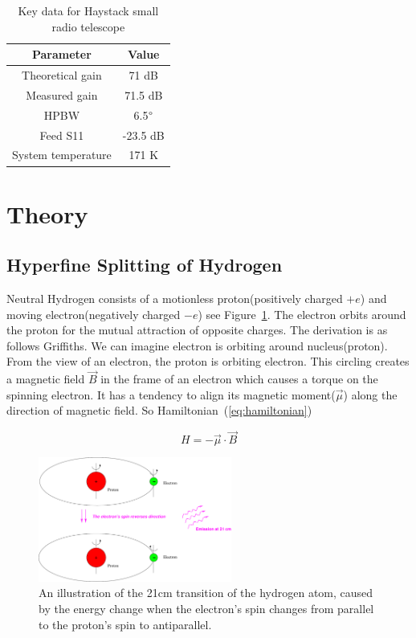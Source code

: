 \documentclass[10pt,conference]{IEEEtran}
\begin{document}
\begin{table}[htbp]
\caption{Key data for Haystack small radio telescope}
\begin{center}
\begin{tabular}{|c|c|}
\hline
\textbf{Parameter}&\multicolumn{1}{|c|}{\textbf{Value}} \\
\cline{1-2} 
\hline
Theoretical gain & 71 dB\\
\hline
Measured gain & 71.5 dB\\
\hline
HPBW & 6.5$\degree$\\
\hline
Feed S11 & -23.5 dB\\
\hline
System temperature & 171 K\\
\hline
\end{tabular}
\label{Tab:block_summerize}
\end{center}
\end{table}

\section{Theory}

\subsection{Hyperfine Splitting of Hydrogen}

Neutral Hydrogen consists of a motionless proton(positively charged $+e$) and moving electron(negatively charged $-e$) see Figure~\ref{fig:hyperfine_figure}. The electron orbits around the proton for the mutual attraction of opposite charges. The derivation is as follows Griffiths\cite{griffiths2016introduction}. We can imagine electron is orbiting around nucleus(proton). From the view of an electron, the proton is orbiting electron. This circling creates a magnetic field $\vec{B}$ in the frame of an electron which causes a torque on the spinning electron. It has a tendency to align its magnetic moment($\vec{\mu}$) along the direction of magnetic field\cite{griffiths2016introduction}. So Hamiltonian~(\ref{eq:hamiltonian})

\begin{equation}
  H=-\vec{\mu}\cdot\vec{B}
  \label{eq:hamiltonian} 
\end{equation}

\begin{figure}[htbp]
\centerline{\includegraphics[width=2.5in]{hyperfine.pdf}}
\caption{An illustration of the 21cm transition of the hydrogen atom, caused by the energy change when the electron's spin changes from parallel to the proton's spin to antiparallel\cite{Dante2014}.}
\label{fig:hyperfine_figure}
\end{figure}
\end{document}
